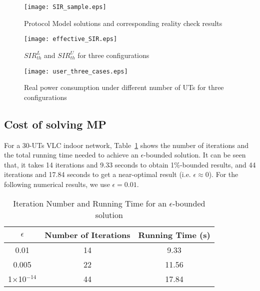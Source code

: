 \documentclass[10pt,journal]{IEEEtran}
\begin{document}
\begin{figure*}
  \centering
  \begin{minipage}[t]{.329\linewidth}
    \texttt{[image: SIR\_sample.eps]}
  \vspace{-10pt}
  \caption{Protocol Model solutions and corresponding reality check results}
  \vspace{-2pt}
  \label{fig_SIR_sample}
  \end{minipage}
  \begin{minipage}[t]{.329\linewidth}
   \texttt{[image: effective\_SIR.eps]}
  \vspace{-10pt}
  \caption{$SIR_{th}^{L}$ and $SIR_{th}^{U}$ for three configurations}
  \vspace{-2pt}
  \label{fig_effective_SIR}
  \end{minipage}
  \begin{minipage}[t]{.329\linewidth}
    \texttt{[image: user\_three\_cases.eps]}
  \vspace{-10pt}
  \caption{Real power consumption under different number of UTs for three configurations}
  \vspace{-2pt}
  \label{fig_user_three_cases}
  \end{minipage}
\end{figure*}

\subsection{Cost of solving MP}
For a 30-UTs VLC indoor network, Table~\ref{table_complexity} shows the number of iterations and the total running time needed to achieve an $\epsilon$-bounded solution. It can be seen that, it takes 14 iterations and 9.33 seconds to obtain 1\%-bounded results, and 44 iterations and 17.84 seconds to get a near-optimal result (i.e. $\epsilon\approx0$). For the following numerical results, we use $\epsilon=0.01$.

\begin{table}
\centering
\caption{Iteration Number and Running Time for an $\epsilon$-bounded solution}
\begin{tabular}{|c|c|c|}
\hline
$\epsilon$&Number of Iterations&Running Time (s)\\\hline
0.01&14&9.33\\
0.005&22&11.56\\
1$\times$10$^{-14}$&44&17.84\\
\hline
\end{tabular}
\label{table_complexity}
\end{table}
\end{document}
